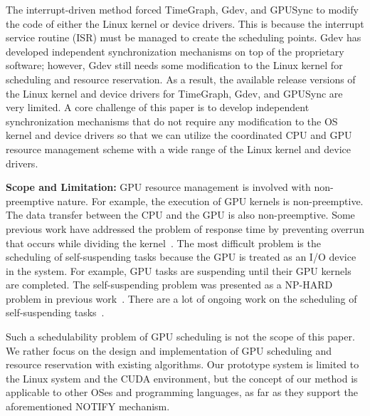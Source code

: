 The interrupt-driven method forced TimeGraph, Gdev, and GPUSync to
modify the code of either the Linux kernel or device drivers.
This is because the interrupt service routine (ISR) must be managed to
create the scheduling points.
Gdev has developed independent synchronization mechanisms on top of the
proprietary software; however, Gdev still needs some modification to the
Linux kernel for scheduling and resource reservation.
As a result, the available release versions of the Linux kernel and
device drivers for TimeGraph, Gdev, and GPUSync are very limited.
A core challenge of this paper is to develop independent synchronization
mechanisms that do not require any modification to the OS kernel and
device drivers so that we can utilize the coordinated CPU and GPU
resource management scheme with a wide range of the Linux kernel and
device drivers. 

\textbf{Scope and Limitation:}
GPU resource management is involved with non-preemptive nature.
For example, the execution of GPU kernels is non-preemptive.
The data transfer between the CPU and the GPU is also non-preemptive.
Some previous work have addressed the problem of response time by
preventing overrun that occurs while dividing the
kernel~\cite{basaran:preemptive,sparc}.
The most difficult problem is the scheduling of self-suspending tasks
because the GPU is treated as an I/O device in the system. 
For example, GPU tasks are suspending until their GPU kernels are
completed.
The self-suspending problem was presented as a NP-HARD problem in
previous work~\cite{self-sus:1,self-sus:2}.
There are a lot of ongoing work on the scheduling of self-suspending
tasks~\cite{chattopadhyay2014limited,kim2013segment}.

Such a schedulability problem of GPU scheduling is not the scope of this
paper.
We rather focus on the design and implementation of GPU scheduling and
resource reservation with existing algorithms.
Our prototype system is limited to the Linux system and the CUDA
environment, but the concept of our method is applicable to other OSes
and programming languages, as far as they support the aforementioned
NOTIFY mechanism.
